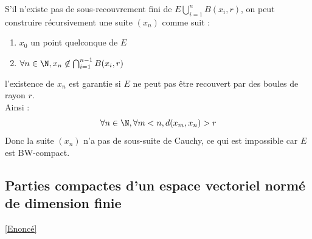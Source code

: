 \documentclass{book}
\begin{document}
	S'il n'existe pas de sous-recouvrement fini de $E\bigcup_{i=1}^n B(x_i,r)$, on peut construire récursivement une suite $(x_n)$ comme suit : 
	\begin{enumerate}[label=\roman*.]
		\item $x_0$ un point quelconque de $E$
		\item $\forall n\in \N, x_n\not\in\bigcap_{i=1}^{n-1}B(x_i,r)$
	\end{enumerate}
	l'existence de $x_n$ est garantie si $E$ ne peut pas être recouvert par des boules de rayon $r$.\\
	Ainsi :
	\[\forall n\in \N, \forall m<n, d(x_m, x_n)>r\]
	Donc la suite $(x_n)$ n'a pas de sous-suite de Cauchy, ce qui est impossible car $E$ est BW-compact.
	
	\subsection{Parties compactes d'un espace vectoriel normé de dimension finie }
	\label{sec:parties-compactes-dun-espace-vectoriel-norme-de-dimension-finie}
	\textcolor{blue}{\hyperref[Parties compactes d'un espace vectoriel normé de dimension finie]{[Enoncé]}}\\
\end{document}

